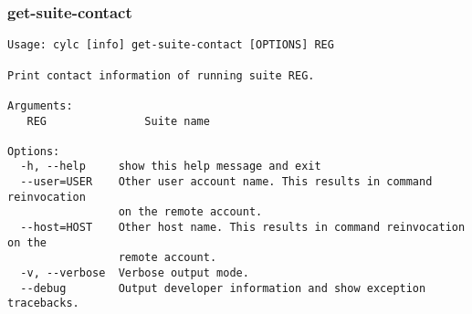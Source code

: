 \subsubsection{get-suite-contact}
\label{get-suite-contact}
\begin{lstlisting}
Usage: cylc [info] get-suite-contact [OPTIONS] REG 

Print contact information of running suite REG.

Arguments:
   REG               Suite name

Options:
  -h, --help     show this help message and exit
  --user=USER    Other user account name. This results in command reinvocation
                 on the remote account.
  --host=HOST    Other host name. This results in command reinvocation on the
                 remote account.
  -v, --verbose  Verbose output mode.
  --debug        Output developer information and show exception tracebacks.
\end{lstlisting}
